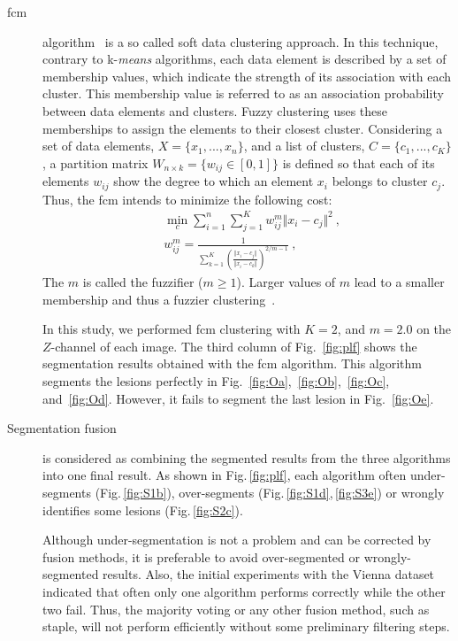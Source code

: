 \begin{description}
\item[\acl{fcm}] algorithm~\cite{bezdek1984fcm} is a so called soft data clustering approach.
In this technique, contrary to k-\textit{means} algorithms, each data element is described by a set of membership values, which indicate the strength of its association with each cluster.
This membership value is referred to as an association probability between data elements and clusters.
Fuzzy clustering uses these memberships to assign the elements to their closest cluster.
Considering a set of data elements, $X=\{x_{1},...,x_{n}\}$, and a list of clusters, $C= \{c_{1}, ...,c_{K}\}$, a partition matrix $W_{n\times k}= \{w_{ij} \in [0,1]\}$ is defined so that each of its elements $w_{ij}$ show the degree to which an element $x_{i}$ belongs to cluster $c_{j}$.
Thus, the \ac{fcm} intends to minimize the following cost:
\begin{subequations}
\begin{align}
& \min\limits_{c} \sum\limits_{i=1}^{n}\sum\limits_{j=1}^{K} w_{ij}^{m}\Vert x_{i}-c_{j} \Vert^{2}~,\\
& w_{ij}^{m} = \frac{1}{\sum\limits_{k=1}^{K} \left(\frac{\Vert x_{i} -c_{j} \Vert}{\Vert x_{i} -c_{k} \Vert}\right)^{2/m-1}}~,
\end{align}
\end{subequations}
\noindent The $m$ is called the fuzzifier ($m\geq 1$).
Larger values of $m$ lead to a smaller membership and thus a fuzzier clustering~\cite{bezdek1984fcm}.

In this study, we performed \ac{fcm} clustering with $K=2$, and $m = 2.0$ on the $Z$-channel of each image. 
The third column of Fig.~\ref{fig:plf} shows the segmentation results obtained with the \ac{fcm} algorithm.
This algorithm segments the lesions perfectly in Fig.~\ref{fig:Oa},~\ref{fig:Ob},~\ref{fig:Oc}, and~\ref{fig:Od}.
However, it fails to segment the last lesion in Fig.~\ref{fig:Oe}.

\item[Segmentation fusion] is considered as combining the segmented results from the three algorithms into one final result.
As shown in Fig.\,\ref{fig:plf}, each algorithm often under-segments (Fig.\,\ref{fig:S1b}), over-segments (Fig.\,\ref{fig:S1d},\,\ref{fig:S3e}) or wrongly identifies some lesions (Fig.\,\ref{fig:S2c}).

Although under-segmentation is not a problem and can be corrected by fusion methods, it is preferable to avoid over-segmented or wrongly-segmented results.
Also, the initial experiments with the Vienna dataset indicated that often only one algorithm performs correctly while the other two fail.
Thus, the majority voting or any other fusion method, such as \acs{staple}, will not perform efficiently without some preliminary filtering steps.



\end{description}
